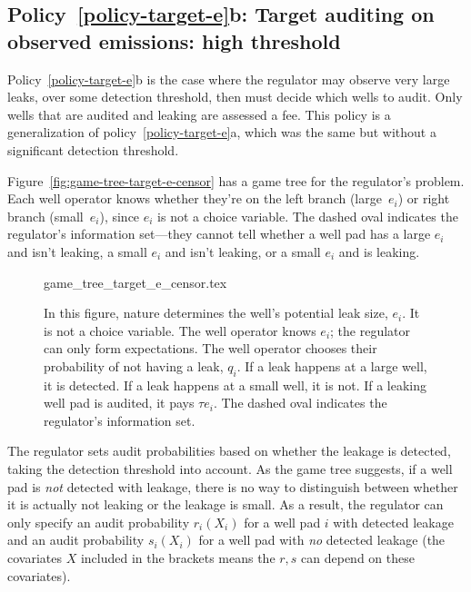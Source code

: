 \documentclass[12pt,oneside,letterpaper]{article}
\theoremstyle{definition}
\begin{document}
\begin{refsection}
\clearpage


\subsection{Policy~\ref{policy-target-e}b: Target auditing on observed emissions: high threshold}
\label{app:audit-target-e-high-threshold}

Policy~\ref{policy-target-e}b is the case where the regulator may observe very large leaks, over some detection threshold, then must decide which wells to audit.
Only wells that are audited and leaking are assessed a fee.
This policy is a generalization of policy~\ref{policy-target-e}a, which was the same but without a significant detection threshold.

Figure~\ref{fig:game-tree-target-e-censor} has a game tree for the regulator's problem.
Each well operator knows whether they're on the left branch (large~\(e_i\)) or right branch (small~\(e_i\)), since \(e_i\) is not a choice variable.
The dashed oval indicates the regulator's information set---they cannot tell whether a well pad has a large \(e_i\) and isn't leaking, a small \(e_i\) and isn't leaking, or a small \(e_i\) and is leaking.

\begin{figure}[!hbt]
{game_tree_target_e_censor.tex}


\begin{minipage}{0.95\textwidth}

\begin{justify}
{\small
In this figure, nature determines the well's potential leak size, \(e_i\).
It is not a choice variable.
The well operator knows \(e_i\); the regulator can only form expectations.
The well operator chooses their probability of not having a leak, \(q_i\).
If a leak happens at a large well, it is detected.
If a leak happens at a small well, it is not.
If a leaking well pad is audited, it pays \(\tau e_i\).
The dashed oval indicates the regulator's information set.
}
\end{justify}
\end{minipage}
\end{figure}



The regulator sets audit probabilities based on whether the leakage is detected, taking
the detection threshold into account.
As the game tree suggests, if a well pad is \textit{not} detected with leakage, there is no way to distinguish between whether it is actually not leaking or the leakage is small.
As a result, the regulator can only specify an audit probability \(r_i(X_i)\) for a well pad \(i\) with detected leakage and an audit probability \(s_i(X_i)\) for a well pad with \textit{no} detected leakage (the covariates \(X\) included in the brackets means the \(r,s\) can depend on these covariates).


\end{refsection}
\end{document}
